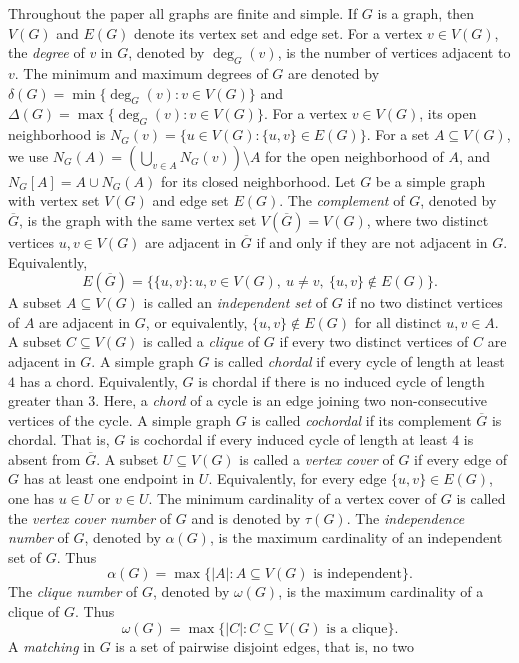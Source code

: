 \documentclass[12pt]{article}
\theoremstyle{definition}
\begin{document}
Throughout the paper all graphs are finite and simple.  If $G$ is a graph, then $V(G)$ and $E(G)$ denote its vertex set and edge set. For a vertex $v\in V(G)$, the \emph{degree} of $v$ in $G$, denoted by
$\deg_G(v)$, is the number of vertices adjacent to $v$.
The minimum and maximum degrees of $G$ are denoted by
$ \delta(G)=\min\{\deg_G(v):v\in V(G)\} $
and
$
\Delta(G)=\max\{\deg_G(v):v\in V(G)\}.
$
  For a vertex $v\in V(G)$, its open neighborhood is
 $N_G(v)=\{u\in V(G):\{u,v\}\in E(G)\}.$  For a set $A\subseteq V(G)$, we use
 $N_G(A)=\left(\bigcup_{v\in A}N_G(v)\right)\setminus A$ 
for the open neighborhood of $A$, and
 $N_G[A]=A\cup N_G(A)$ 
for its closed neighborhood. Let $G$ be a simple graph with vertex set $V(G)$ and edge set $E(G)$.
 The \emph{complement} of $G$, denoted by $\overline{G}$, is the graph with the same
vertex set $V(\overline{G})=V(G)$, where two distinct vertices $u,v\in V(G)$ are
adjacent in $\overline{G}$ if and only if they are not adjacent in $G$. Equivalently,
\[
E(\overline{G})=\bigl\{\{u,v\}:u,v\in V(G),\ u\ne v,\ \{u,v\}\notin E(G)\bigr\}.
\]
 A subset $A\subseteq V(G)$ is called an \emph{independent set} of $G$ if no two
distinct vertices of $A$ are adjacent in $G$, or equivalently,
 $\{u,v\}\notin E(G)$ for all distinct $u,v\in A.$ A subset $C\subseteq V(G)$ is called a \emph{clique} of $G$ if every two distinct
vertices of $C$ are adjacent in $G$. 
A simple graph $G$ is called \emph{chordal} if every cycle of length at least $4$
has a chord. Equivalently, $G$ is chordal if there is no induced cycle of length
greater than $3$. Here, a \emph{chord} of a cycle is an edge joining two non-consecutive vertices
of the cycle. A simple graph $G$ is called \emph{cochordal} if its complement $\overline{G}$ is
chordal. That is, $G$ is cochordal if every induced cycle of length at least $4$
is absent from $\overline{G}$.
 A subset $U\subseteq V(G)$ is called a \emph{vertex cover} of $G$ if every edge
of $G$ has at least one endpoint in $U$. Equivalently, for every edge
$\{u,v\}\in E(G)$, one has $u\in U$ or $v\in U$. The minimum cardinality of a
vertex cover of $G$ is called the \emph{vertex cover number} of $G$ and is
denoted by $\tau(G)$. The \emph{independence number} of $G$, denoted by $\alpha(G)$, is the maximum
cardinality of an independent set of $G$. Thus
$$
\alpha(G)=\max\{|A|:A\subseteq V(G)\text{ is independent}\}.
$$
 The \emph{clique number} of $G$, denoted by $\omega(G)$, is the maximum
cardinality of a clique of $G$. Thus
$$
\omega(G)=\max\{|C|:C\subseteq V(G)\text{ is a clique}\}.
$$
 A \emph{matching} in $G$ is a set of pairwise disjoint edges, that is, no two
\end{document}

